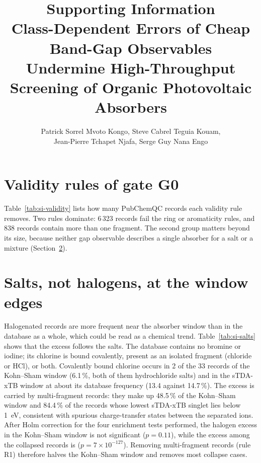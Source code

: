 \documentclass[11pt]{article}
\title{Supporting Information\\[4pt]\large Class-Dependent Errors of Cheap Band-Gap Observables\\ Undermine
High-Throughput Screening of Organic Photovoltaic Absorbers}
\author{Patrick Sorrel Mvoto Kongo, Steve Cabrel Teguia Kouam,\\ Jean-Pierre Tchapet Njafa, Serge Guy Nana Engo}
\date{}
\begin{document}
\maketitle
\tableofcontents

\section{Validity rules of gate G0}
Table~\ref{tab:si-validity} lists how many PubChemQC records each validity rule removes. Two rules dominate: 6\,323
records fail the ring or aromaticity rules, and 838 records contain more than one fragment. The second group matters
beyond its size, because neither gap observable describes a single absorber for a salt or a mixture
(Section~\ref{sec:salts}).


\section{Salts, not halogens, at the window edges}\label{sec:salts}
Halogenated records are more frequent near the absorber window than in the database as a whole, which could be read as
a chemical trend. Table~\ref{tab:si-salts} shows that the excess follows the salts. The database contains no bromine or
iodine; its chlorine is bound covalently, present as an isolated fragment (chloride or HCl), or both. Covalently bound
chlorine occurs in 2 of the 33 records of the Kohn--Sham window (6.1\,\%, both of them hydrochloride salts) and in
the sTDA-xTB window at about its database frequency (13.4 against 14.7\,\%). The excess is carried by multi-fragment
records: they make up 48.5\,\% of the Kohn--Sham window and 84.4\,\% of the records whose lowest sTDA-xTB singlet
lies below \qty{1}{eV}, consistent with spurious charge-transfer states between the separated ions. After Holm correction for the four enrichment tests performed, the halogen excess in the
Kohn--Sham window is not significant ($p = 0.11$), while the excess among the collapsed records is ($p = 7 \times
10^{-127}$). Removing multi-fragment records (rule R1) therefore halves the Kohn--Sham window and removes most
collapse cases.
\end{document}

